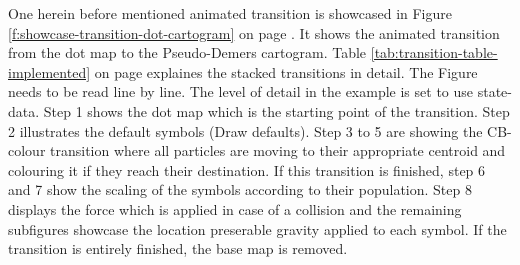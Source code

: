 One herein before mentioned animated transition is showcased in Figure \ref{f:showcase-transition-dot-cartogram} on page \pageref{f:showcase-transition-dot-cartogram}. It shows the animated transition from the dot map to the Pseudo-Demers cartogram. Table \ref{tab:transition-table-implemented} on page \pageref{tab:transition-table-implemented} explaines the stacked transitions in detail. The Figure needs to be read line by line. The level of detail in the example is set to use state-data. Step 1 shows the dot map which is the starting point of the transition. Step 2 illustrates the default symbols (Draw defaults). Step 3 to 5 are showing the CB-colour transition where all particles are moving to their appropriate centroid and colouring it if they reach their destination. If this transition is finished, step 6 and 7 show the scaling of the symbols according to their population. Step 8 displays the force which is applied in case of a collision and the remaining subfigures showcase the location preserable gravity applied to each symbol. If the transition is entirely finished, the base map is removed.

